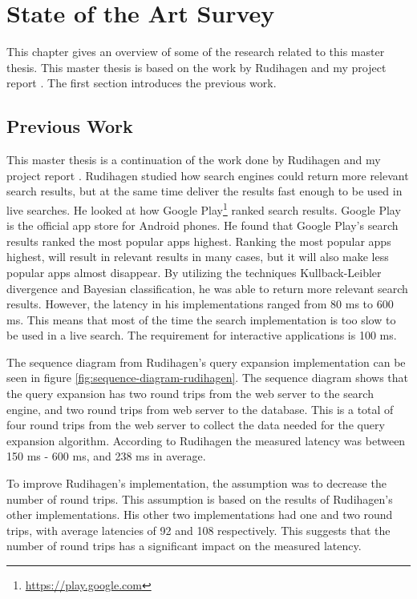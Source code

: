 \chapter{State of the Art Survey}
\label{ch:related-work}
This chapter gives an overview of some of the research related to this master thesis.
This master thesis is based on the work by Rudihagen \cite{master-thesis} and my project report \cite{project-report}.
The first section introduces the previous work.

\section{Previous Work}
\label{sec:previous-work}
This master thesis is a continuation of the work done by Rudihagen \cite{master-thesis} and my project report \cite{project-report}.
Rudihagen studied how search engines could return more relevant search results,
but at the same time deliver the results fast enough to be used in live searches.
He looked at how Google Play\footnote{\url{https://play.google.com}} ranked search results.
Google Play is the official app store for Android phones.
He found that Google Play's search results ranked the most popular apps highest.
Ranking the most popular apps highest, will result in relevant results in many cases,
but it will also make less popular apps almost disappear.
By utilizing the techniques Kullback-Leibler divergence and Bayesian classification,
he was able to return more relevant search results.
However, the latency in his implementations ranged from 80 ms to 600 ms.
This means that most of the time the search implementation is too slow to be used in a live search.
The requirement for interactive applications is 100 ms.

The sequence diagram from Rudihagen's query expansion implementation can be seen in figure \ref{fig:sequence-diagram-rudihagen}.
The sequence diagram shows that the query expansion has two round trips from the web server to the search engine,
and two round trips from web server to the database.
This is a total of four round trips from the web server to collect the data needed for the query expansion algorithm.
According to Rudihagen the measured latency was between 150 ms - 600 ms, and 238 ms in average.

To improve Rudihagen's implementation, the assumption was to decrease the number of round trips.
This assumption is based on the results of Rudihagen's other implementations.
His other two implementations had one and two round trips,
with average latencies of 92 and 108 respectively.
This suggests that the number of round trips has a significant impact on the measured latency.

